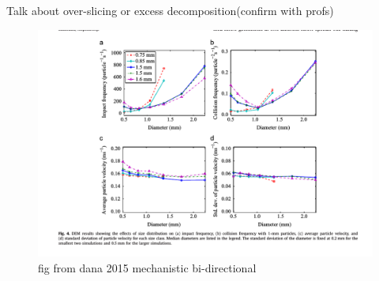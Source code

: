 \documentclass[preprint,11pt,authoryear]{elsarticle}
\begin{document}
	    \par Talk about over-slicing or excess decomposition(confirm with profs)
	      \begin{figure}[H]
	      \centering
	      \includegraphics[scale=0.5]{rslts_dem_psd_velocity}
	      \caption{ fig from dana 2015 mechanistic bi-directional}
	      \label{fig:rslts_psd_velocity}
	      \end{figure}
	      
	      
\end{document}
